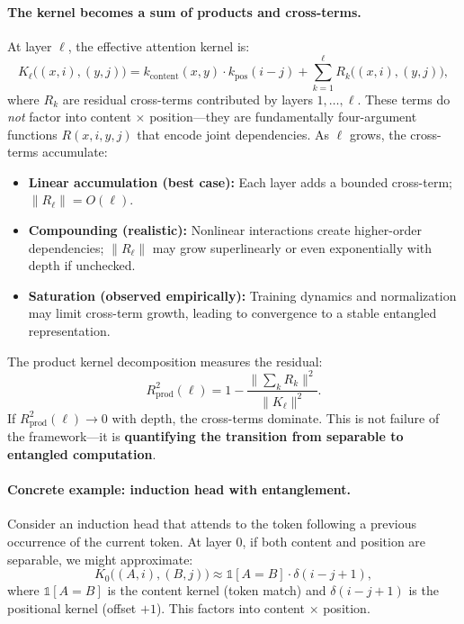 \documentclass[11pt]{article}
\theoremstyle{definition}
\begin{document}
\paragraph{The kernel becomes a sum of products and cross-terms.}
At layer $\ell$, the effective attention kernel is:
\[
K_\ell\big((x,i),(y,j)\big) = k_{\text{content}}(x,y) \cdot k_{\text{pos}}(i-j) + \sum_{k=1}^\ell R_k\big((x,i),(y,j)\big),
\]
where $R_k$ are residual cross-terms contributed by layers $1, \ldots, \ell$. These terms do \emph{not} factor into content $\times$ position---they are fundamentally four-argument functions $R(x,i,y,j)$ that encode joint dependencies. As $\ell$ grows, the cross-terms accumulate:
\begin{itemize}
    \item \textbf{Linear accumulation (best case):} Each layer adds a bounded cross-term; $\|R_\ell\| = O(\ell)$.
    \item \textbf{Compounding (realistic):} Nonlinear interactions create higher-order dependencies; $\|R_\ell\|$ may grow superlinearly or even exponentially with depth if unchecked.
    \item \textbf{Saturation (observed empirically):} Training dynamics and normalization may limit cross-term growth, leading to convergence to a stable entangled representation.
\end{itemize}

The product kernel decomposition measures the residual:
\[
R^2_{\text{prod}}(\ell) = 1 - \frac{\|\sum_k R_k\|^2}{\|K_\ell\|^2}.
\]
If $R^2_{\text{prod}}(\ell) \to 0$ with depth, the cross-terms dominate. This is not failure of the framework---it is \textbf{quantifying the transition from separable to entangled computation}.

\paragraph{Concrete example: induction head with entanglement.}
Consider an induction head \cite{olsson2022induction} that attends to the token following a previous occurrence of the current token. At layer 0, if both content and position are separable, we might approximate:
\[
K_0\big((A, i), (B, j)\big) \approx \mathbb{1}[A = B] \cdot \delta(i - j + 1),
\]
where $\mathbb{1}[A = B]$ is the content kernel (token match) and $\delta(i - j + 1)$ is the positional kernel (offset $+1$). This factors into content $\times$ position.
\end{document}
